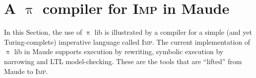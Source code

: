 \documentclass[a4paper,openany]{book}
\begin{document}
\chapter{A $\uppi$ compiler for \textsc{Imp} in Maude}\label{sec:imp}

In this Section, the use of $\uppi$ lib is illustrated by a compiler for a simple (and yet Turing-complete) imperative language called \textsc{Imp}. 
The current implementation of $\uppi$ lib in Maude supports execution by rewriting, symbolic execution by narrowing and LTL model-checking. These are the tools that are ``lifted'' from Maude to \textsc{Imp}.


\end{document}
